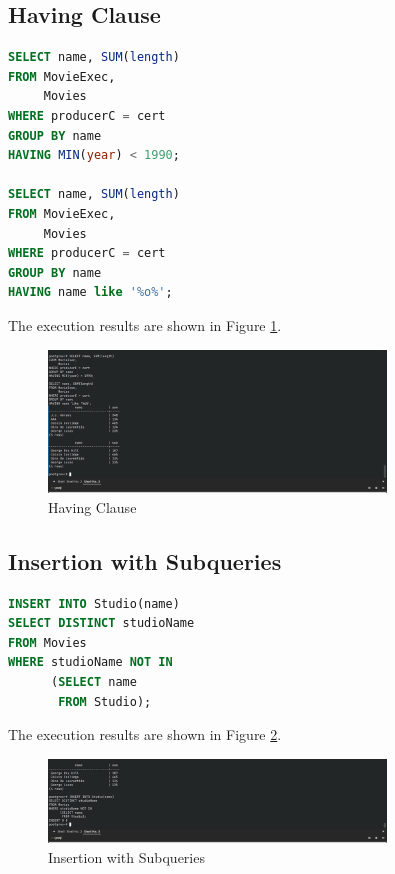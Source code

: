 \documentclass{cshwk}
\begin{document}
\subsection{Having Clause}

\begin{lstlisting}[language=sql]
SELECT name, SUM(length)
FROM MovieExec,
     Movies
WHERE producerC = cert
GROUP BY name
HAVING MIN(year) < 1990;

SELECT name, SUM(length)
FROM MovieExec,
     Movies
WHERE producerC = cert
GROUP BY name
HAVING name like '%o%';
\end{lstlisting}

The execution results are shown in Figure \ref{fig:having-clause}.
\begin{figure}[H]
    \centering
    \includegraphics[width=0.8\textwidth]{hw6-5.png}
    \caption{Having Clause}
    \label{fig:having-clause}
\end{figure}

\subsection{Insertion with Subqueries}

\begin{lstlisting}[language=sql]
INSERT INTO Studio(name)
SELECT DISTINCT studioName
FROM Movies
WHERE studioName NOT IN
      (SELECT name
       FROM Studio);
\end{lstlisting}

The execution results are shown in Figure \ref{fig:insertion-subqueries}.
\begin{figure}[H]
    \centering
    \includegraphics[width=0.8\textwidth]{hw6-6.png}
    \caption{Insertion with Subqueries}
    \label{fig:insertion-subqueries}
\end{figure}
\end{document}
